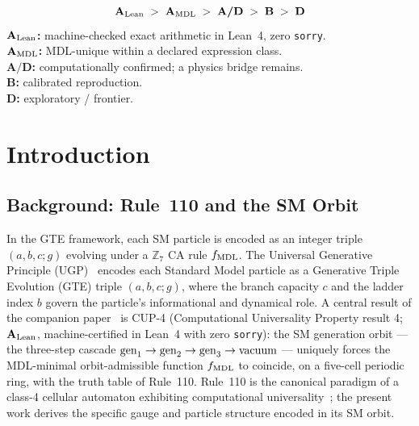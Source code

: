 \documentclass[11pt]{article}
\theoremstyle{remark}
\newcommand{\CatAL}{\ensuremath{\textbf{A}_{\rm Lean}}}
\newcommand{\CatAMDL}{\ensuremath{\textbf{A}_{\rm MDL}}}
\newcommand{\CatAD}{\textbf{A/D}}
\newcommand{\CatB}{\textbf{B}}
\newcommand{\CatD}{\textbf{D}}
\begin{document}
\begin{tcolorbox}[colback=gray!4,colframe=gray!50!black,
  title={\textbf{Claim-strength taxonomy}},
  fonttitle=\bfseries,left=6pt,right=6pt,top=5pt,bottom=5pt]
\small
\[
\CatAL \;>\; \CatAMDL \;>\; \CatAD \;>\; \CatB \;>\; \CatD
\]
\textbf{$\CatAL$:} machine-checked exact arithmetic in Lean~4, zero \texttt{sorry}.\\
\textbf{$\CatAMDL$:} MDL-unique within a declared expression class.\\
\textbf{$\CatAD$:} computationally confirmed; a physics bridge remains.\\
\textbf{$\CatB$:} calibrated reproduction.\\
\textbf{$\CatD$:} exploratory / frontier.
\end{tcolorbox}

\section{Introduction}
\label{sec:intro}

\subsection{Background: Rule~110 and the SM Orbit}

In the GTE framework, each SM particle is encoded as an integer triple $(a,b,c;g)$
evolving under a $\mathbb{Z}_7$ CA rule $f_{\rm MDL}$.
The Universal Generative Principle (UGP)~\cite{Spivack2026_SM_UGP} encodes
each Standard Model particle as a Generative Triple Evolution (GTE) triple
$(a, b, c; g)$, where the branch capacity $c$ and the ladder index $b$ govern
the particle's informational and dynamical role.
A central result of the companion
paper~\cite{SpivackCompUniversality} is CUP-4 (Computational Universality Property result 4; $\CatAL$, machine-certified in
Lean~4 with zero \texttt{sorry}): the SM generation orbit --- the three-step
cascade ${\rm gen}_1 \to {\rm gen}_2 \to {\rm gen}_3 \to {\rm vacuum}$ ---
uniquely forces the MDL-minimal orbit-admissible function $f_{\rm MDL}$ to
coincide, on a five-cell periodic ring, with the truth table of Rule~110.
Rule~110 is the canonical paradigm of a class-4 cellular automaton exhibiting
computational universality~\cite{Wolfram2020Tech,Cook2004}; the present work
derives the specific gauge and particle structure encoded in its SM orbit.
\end{document}
